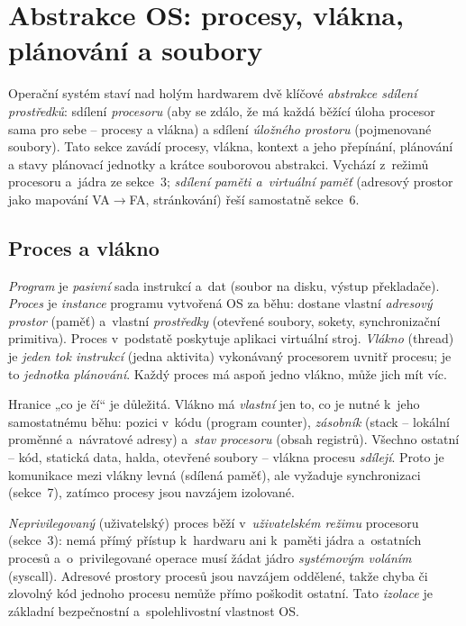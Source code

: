 \section{Abstrakce OS: procesy, vlákna, plánování a soubory}

Operační systém staví nad holým hardwarem dvě klíčové \emph{abstrakce sdílení prostředků}: sdílení \emph{procesoru} (aby se zdálo, že má každá běžící úloha procesor sama pro sebe -- procesy a vlákna) a sdílení \emph{úložného prostoru} (pojmenované soubory). Tato sekce zavádí procesy, vlákna, kontext a jeho přepínání, plánování a stavy plánovací jednotky a krátce souborovou abstrakci. Vychází z~režimů procesoru a~jádra ze sekce~3; \emph{sdílení paměti a~virtuální paměť} (adresový prostor jako mapování VA$\to$FA, stránkování) řeší samostatně sekce~6.

\subsection{Proces a vlákno}

\begin{definice}
\emph{Program} je \emph{pasivní} sada instrukcí a~dat (soubor na disku, výstup překladače). \emph{Proces} je \emph{instance} programu vytvořená OS za běhu: dostane vlastní \emph{adresový prostor} (paměť) a~vlastní \emph{prostředky} (otevřené soubory, sokety, synchronizační primitiva). Proces v~podstatě poskytuje aplikaci virtuální stroj. \emph{Vlákno} (thread) je \emph{jeden tok instrukcí} (jedna aktivita) vykonávaný procesorem uvnitř procesu; je to \emph{jednotka plánování}. Každý proces má aspoň jedno vlákno, může jich mít víc.
\end{definice}

\begin{intuice}
Hranice „co je čí`` je důležitá. Vlákno má \emph{vlastní} jen to, co je nutné k~jeho samostatnému běhu: pozici v~kódu (program counter), \emph{zásobník} (stack -- lokální proměnné a~návratové adresy) a~\emph{stav procesoru} (obsah registrů). Všechno ostatní -- kód, statická data, halda, otevřené soubory -- vlákna procesu \emph{sdílejí}. Proto je komunikace mezi vlákny levná (sdílená paměť), ale vyžaduje synchronizaci (sekce~7), zatímco procesy jsou navzájem izolované.
\end{intuice}

\begin{definice}
\emph{Neprivilegovaný} (uživatelský) proces běží v~\emph{uživatelském režimu} procesoru (sekce~3): nemá přímý přístup k~hardwaru ani k~paměti jádra a~ostatních procesů a~o~privilegované operace musí žádat jádro \emph{systémovým voláním} (syscall). Adresové prostory procesů jsou navzájem oddělené, takže chyba či zlovolný kód jednoho procesu nemůže přímo poškodit ostatní. Tato \emph{izolace} je základní bezpečnostní a~spolehlivostní vlastnost OS.
\end{definice}

